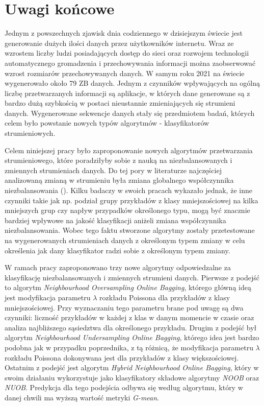 \chapter{Uwagi końcowe}

\noindent Jednym z powszechnych zjawisk dnia codziennego w dzisiejszym świecie jest generowanie dużych ilości danych przez użytkowników internetu. Wraz ze wzrostem liczby ludzi posiadających dostęp do sieci oraz rozwojem technologii automatycznego gromadzenia i przechowywania informacji można zaobserwować wzrost rozmiarów przechowywanych danych. W samym roku 2021 na świecie wygenerowało około 79 ZB danych. Jednym z czynników wpływających na ogólną liczbę przetwarzanych informacji są aplikacje, w których dane generowane są z bardzo dużą szybkością w postaci nieustannie zmieniających się strumieni danych. Wygenerowane sekwencje danych stały się przedmiotem badań, których celem było powstanie nowych typów algorytmów - klasyfikatorów strumieniowych.

Celem niniejszej pracy było zaproponowanie nowych algorytmów przetwarzania strumieniowego, które poradziłyby sobie z nauką na niezbalansowanych i zmiennych strumieniach danych. Do tej pory w literaturze najczęściej analizowaną zmianą w strumieniu była zmiana globalnego współczynnika niezbalansowania (). Kilku badaczy w swoich pracach wykazało jednak, że inne czynniki takie jak np. podział grupy przykładów z klasy mniejszościowej na kilka mniejszych grup czy napływ przypadków określonego typu, mogą być znacznie bardziej wpływowe na jakość klasyfikacji aniżeli zmiana współczynnika niezbalansowania. Wobec tego faktu stworzone algorytmy zostały przetestowane na wygenerowanych strumieniach danych z określonym typem zmiany w celu określenia jak dany klasyfikator radzi sobie z określonym typem zmiany.

W ramach pracy zaproponowano trzy nowe algorytmy odpowiedzalne za klasyfikację niezbalansowanych i zmiennych strumieni danych. Pierwsze z podejść to algorytm \textit{Neighbourhood Oversampling Online Bagging}, którego główną ideą jest modyfikacja parametru $\lambda$ rozkładu Poissona dla przykładów z klasy mniejszościowej. Przy wyznaczaniu tego parametru brane pod uwagę są dwa czynniki: liczność przykładów w każdej z klas w danym momencie w czasie oraz analiza najbliższego sąsiedztwa dla określonego przykładu. Drugim z podejść był algorytm \textit{Neighbourhood Undersampling Online Bagging}, którego idea jest bardzo podobna jak w przypadku poprzednika, z tą różnicą, że modyfikacja parametru $\lambda$ rozkładu Poissona dokonywana jest dla przykładów z klasy większościowej. Ostatnim z podejść jest algorytm \textit{Hybrid Neighbourhood Online Bagging}, który w swoim działaniu wykorzystuje jako klasyfikatory składowe algorytmy \textit{NOOB} oraz \textit{NUOB}. Predykcja dla tego podejścia odbywa się według algorytmu, który w danej chwili ma wyższą wartość metryki \textit{G-mean}.

